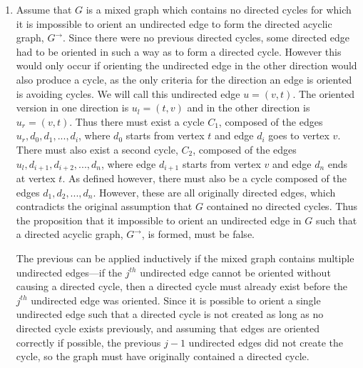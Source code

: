 \documentclass{article}
\begin{document}
\begin{enumerate}
\begin{enumerate}
\end{enumerate}	


\item Assume that $G$ is a mixed graph which contains no directed cycles for which it is impossible to orient an undirected edge to form the directed acyclic graph, $G^{\rightarrow}$. Since there were no previous directed cycles, some directed edge had to be oriented in such a way as to form a directed cycle.  However this would only occur if orienting the undirected edge in the other direction would also produce a cycle, as the only criteria for the direction an edge is oriented is avoiding cycles. We will call this undirected edge $u = (v,t)$.  The oriented version in one direction is $u_l = (t,v)$ and in the other direction is $u_r = (v,t)$. Thus there must exist a cycle $C_1$, composed of the edges $u_r,d_0,d_1,...,d_i$, where $d_0$ starts from vertex $t$ and edge $d_i$ goes to vertex $v$.  There must also exist a second cycle, $C_2$, composed of the edges $u_l,d_{i+1},d_{i+2},...,d_n$, where edge $d_{i+1}$ starts from vertex $v$ and edge $d_n$ ends at vertex $t$. As defined however, there must also be a cycle composed of the edges $d_1,d_2,...,d_n$.  However, these are all originally directed edges, which contradicts the original assumption that $G$ contained no directed cycles. Thus the proposition that it impossible to orient an undirected edge in $G$ such that a directed acyclic graph, $G^{\rightarrow}$, is formed, must be false.

\par The previous can be applied inductively if the mixed graph contains multiple undirected edges---if the $j^{th}$ undirected edge cannot be oriented without causing a directed cycle, then a directed cycle must already exist before the $j^{th}$ undirected edge was oriented. Since it is possible to orient a single undirected edge such that a directed cycle is not created as long as no directed cycle exists previously, and assuming that edges are oriented correctly if possible, the previous $j-1$ undirected edges did not create the cycle, so the graph must have originally contained a directed cycle.


\end{enumerate}
\end{document}
